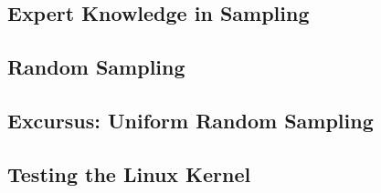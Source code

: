 
\subsection{Expert Knowledge in Sampling}

\subsection{Random Sampling}

\subsection{Excursus: Uniform Random Sampling}

\subsection{Testing the Linux Kernel}




